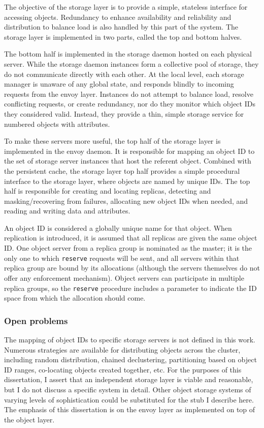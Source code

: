 The objective of the storage layer is to provide a simple, stateless interface for accessing objects. Redundancy to enhance availability and reliability and distribution to balance load is also handled by this part of the system. The storage layer is implemented in two parts, called the top and bottom halves.

The bottom half is implemented in the storage daemon hosted on each physical server. While the storage daemon instances form a collective pool of storage, they do not communicate directly with each other. At the local level, each storage manager is unaware of any global state, and responds blindly to incoming requests from the envoy layer. Instances do not attempt to balance load, resolve conflicting requests, or create redundancy, nor do they monitor which object IDs they considered valid. Instead, they provide a thin, simple storage service for numbered objects with attributes.

To make these servers more useful, the top half of the storage layer is implemented in the envoy daemon. It is responsible for mapping an object ID to the set of storage server instances that host the referent object. Combined with the persistent cache, the storage layer top half provides a simple procedural interface to the storage layer, where objects are named by unique IDs. The top half is responsible for creating and locating replicas, detecting and masking/recovering from failures, allocating new object IDs when needed, and reading and writing data and attributes.

An object ID is considered a globally unique name for that object. When replication is introduced, it is assumed that all replicas are given the same object ID. One object server from a replica group is nominated as the master; it is the only one to which \texttt{reserve} requests will be sent, and all servers within that replica group are bound by its allocations (although the servers themselves do not offer any enforcement mechanism). Object servers can participate in multiple replica groups, so the \texttt{reserve} procedure includes a parameter to indicate the ID space from which the allocation should come.

\subsubsection{Open problems}

The mapping of object IDs to specific storage servers is not defined in this work. Numerous strategies are available for distributing objects across the cluster, including random distribution, chained declustering, partitioning based on object ID ranges, co-locating objects created together, etc. For the purposes of this dissertation, I assert that an independent storage layer is viable and reasonable, but I do not discuss a specific system in detail. Other object storage systems of varying levels of sophistication could be substituted for the stub I describe here. The emphasis of this dissertation is on the envoy layer as implemented on top of the object layer.

